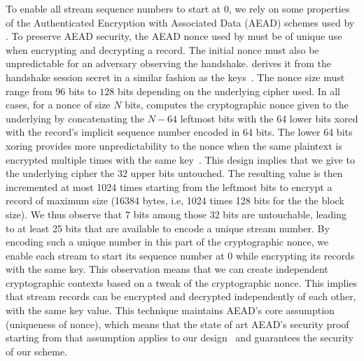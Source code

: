 To enable all stream sequence numbers to start at 0, we rely on some properties
of the Authenticated Encryption with Associated Data (AEAD) schemes used by . To preserve AEAD security, the AEAD nonce used by \tcpls must be of unique
use when encrypting and decrypting a record. The initial nonce must also be
unpredictable for an adversary observing the handshake. \tcpls derives it from
the \tls handshake session secret in a similar fashion as the \tls
keys~\cite{rfc8446}. The nonce size must range from $96$ bits to $128$ bits
depending on the underlying cipher used. In all cases, for a nonce of size $N$
bits, \tls computes the cryptographic nonce given to the underlying  by
concatenating the $N-64$ leftmost bits with the 64 lower bits xored with the
record's implicit sequence number encoded in 64 bits. The lower 64 bits xoring
provides more unpredictability to the nonce when the same plaintext is encrypted
multiple times with the same key~\cite{bellare2016multi,hoang2018multi}. This
design implies that we give to the underlying cipher the 32 upper bits
untouched. The resulting value is then incremented at most 1024 times starting
from the leftmost bits to encrypt a \tls record of maximum size (16384 bytes,
i.e, 1024 times 128 bits for the the
 block size). We thus observe that 7 bits among those 32 bits are
untouchable, leading to at least 25 bits that are available to encode a unique
stream number. By encoding such a unique number in this part of the
cryptographic nonce, we enable each stream to start its sequence number at 0
while encrypting its records with the same key. This observation means that we
can create independent cryptographic contexts based on a tweak of the
cryptographic nonce. This implies that stream records can be encrypted and
decrypted independently of each other, with the same key value. This technique
maintains AEAD's core assumption (uniqueness of nonce), which means that the
state of art AEAD's security proof starting from that assumption applies to our
design~\cite{chatterjee2011another} and guarantees the security of our scheme.

